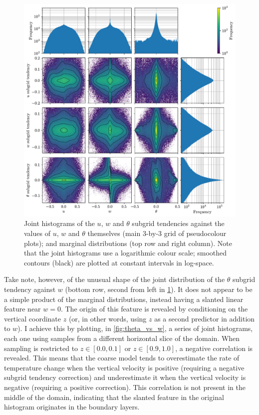 \documentclass[../main.tex]{subfiles}
\begin{document}
\begin{figure}[ht]
    \centering
    \includegraphics[width=\linewidth]{figures/subgrid_vs_vars.pdf}
    \caption{
        Joint histograms of the $u$, $w$ and $\theta$ subgrid tendencies
        against the values of $u$, $w$ and $\theta$ themselves (main 3-by-3
        grid of pseudocolour plots); and marginal distributions (top row and
        right column). Note that the joint histograms use a logarithmic
        colour scale; smoothed contours (black) are plotted at constant
        intervals in log-space.
    }
    \label{fig:subgrid_vs_vars}
\end{figure}

Take note, however, of the unusual shape of the joint distribution of the
$\theta$ subgrid tendency against $w$ (bottom row, second from left in
\cref{fig:subgrid_vs_vars}). It does not appear to be a simple product of the
marginal distributions, instead having a slanted linear feature near $w=0$. The
origin of this feature is revealed by conditioning on the vertical coordinate
$z$ (or, in other words, using $z$ as a second predictor in addition to $w$). I
achieve this by plotting, in \cref{fig:theta_vs_w}, a series of joint
histograms, each one using samples from a different horizontal slice of the
domain. When sampling is restricted to $z \in [0.0, 0.1]$ or $z \in [0.9,
1.0]$, a negative correlation is revealed. This means that the coarse model
tends to overestimate the rate of temperature change when the vertical velocity
is positive (requiring a negative subgrid tendency correction) and
underestimate it when the vertical velocity is negative (requiring a positive
correction). This correlation is not present in the middle of the domain,
indicating that the slanted feature in the original histogram originates in the
boundary layers.
\end{document}
